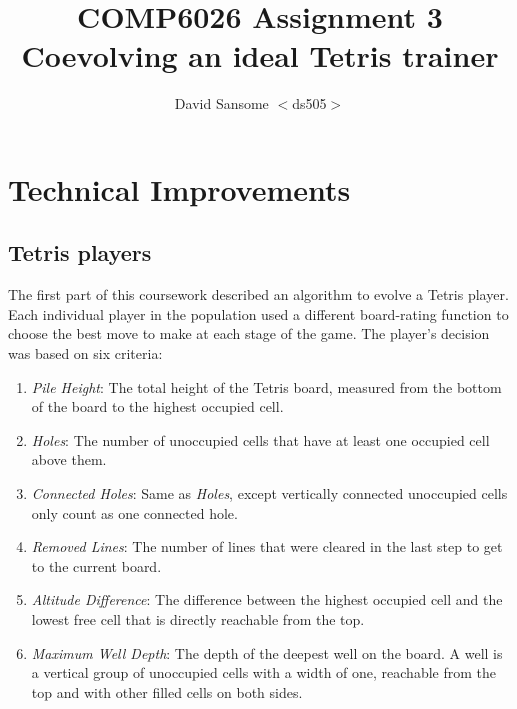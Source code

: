 \documentclass[a4paper,11pt]{article}
\title{COMP6026 Assignment 3 \\
Coevolving an ideal Tetris trainer}
\author{David Sansome $<$ds505$>$}
\newcounter{savedcounter}
\begin{document}


\maketitle

\begin{abstract}



\end{abstract}

\clearpage
\tableofcontents

\section{Technical Improvements}

\subsection{Tetris players}
\label{players}

The first part of this coursework described an algorithm to evolve a Tetris
player.
Each individual player in the population used a different board-rating function
to choose the best move to make at each stage of the game.
The player's decision was based on six criteria:

\begin{enumerate}
  \item \emph{Pile Height}: The total height of the Tetris board, measured from
      the bottom of the board to the highest occupied cell.
  \item \emph{Holes}: The number of unoccupied cells that have at least one
      occupied cell above them.
  \item \emph{Connected Holes}: Same as \emph{Holes}, except vertically
      connected unoccupied cells only count as one connected hole.
  \item \emph{Removed Lines}: The number of lines that were cleared in the last
      step to get to the current board.
  \item \emph{Altitude Difference}: The difference between the highest occupied
      cell and the lowest free cell that is directly reachable from the top.
  \item \emph{Maximum Well Depth}: The depth of the deepest well on the board.
      A well is a vertical group of unoccupied cells with a width of one,
      reachable from the top and with other filled cells on both sides.
  \setcounter{savedcounter}{\theenumi}
\end{enumerate}
\end{document}
